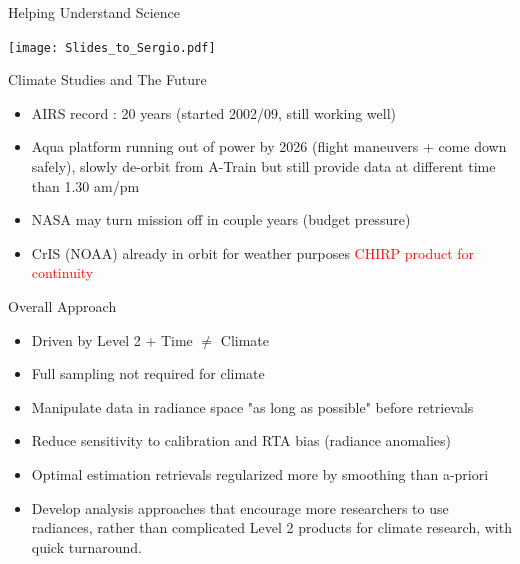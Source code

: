 \documentclass[10pt,t]{beamer}
\begin{document}
\begin{frame}{Helping Understand Science}
\vspace{-0.35in}
\begin{center}
\texttt{[image: Slides\_to\_Sergio.pdf]}
\end{center}
\end{frame}

\begin{frame}{Climate Studies and The Future}
\begin{itemize}
  \item AIRS record : 20 years (started 2002/09, still working well)  
  \item Aqua platform running out of power by 2026 (flight maneuvers + come down safely), slowly de-orbit from A-Train
        but still provide data at different time than 1.30 am/pm
  \item NASA may turn mission off in couple years (budget pressure)
  \item CrIS (NOAA) already in orbit for weather purposes \textcolor{red}{CHIRP product for continuity}
\end{itemize}
\end{frame}

\begin{frame}{Overall Approach}
\begin{itemize}
\item Driven by Level 2 + Time \(\neq\) Climate
\item Full sampling not required for climate
\item Manipulate data in radiance space "as long as possible" before retrievals
\item Reduce sensitivity to calibration and RTA bias (radiance anomalies)
\item Optimal estimation retrievals regularized more by smoothing than a-priori
\item Develop analysis approaches that encourage more researchers to use radiances, rather than complicated Level 2 products for climate research, with quick turnaround.
\end{itemize}
\end{frame}
\end{document}
